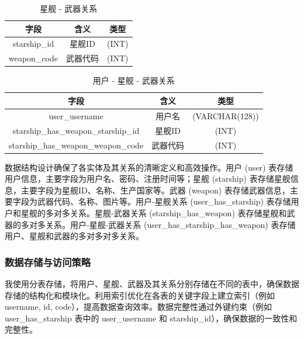 \documentclass{base}
\begin{document}
\begin{table}[H]
	\centering
	\caption{星舰 - 武器关系}
	\begin{tabular}{@{}ccc@{}}
		\toprule
		字段           & 含义   & 类型    \\ \midrule
		starship\_id & 星舰ID & (INT) \\
		weapon\_code & 武器代码 & (INT) \\ \bottomrule
	\end{tabular}
\end{table}

\begin{table}[H]
		\centering
	\caption{用户 - 星舰 - 武器关系}
	\begin{tabular}{@{}ccc@{}}
		\toprule
		字段                                                      & 含义                       & 类型                        \\ \midrule
		user\_username                                          & 用户名                      & (VARCHAR(128))            \\
		starship\_has\_weapon\_starship\_id                     & 星舰ID                     & (INT)                     \\
		starship\_has\_weapon\_weapon\_code & 武器代码 & (INT) \\ \bottomrule
	\end{tabular}
\end{table}

数据结构设计确保了各实体及其关系的清晰定义和高效操作。用户 (user) 表存储用户信息，主要字段为用户名、密码、注册时间等；星舰 (starship) 表存储星舰信息，主要字段为星舰ID、名称、生产国家等。武器 (weapon) 表存储武器信息，主要字段为武器代码、名称、图片等。用户-星舰关系 (user\_has\_starship) 表存储用户和星舰的多对多关系。星舰-武器关系 (starship\_has\_weapon) 表存储星舰和武器的多对多关系。用户-星舰-武器关系 (user\_has\_starship\_has\_weapon) 表存储用户、星舰和武器的多对多对多关系。

\subsubsection{数据存储与访问策略}

我使用分表存储，将用户、星舰、武器及其关系分别存储在不同的表中，确保数据存储的结构化和模块化。利用索引优化在各表的关键字段上建立索引（例如 username, id, code），提高数据查询效率。数据完整性通过外键约束（例如 user\_has\_starship 表中的 user\_username 和 starship\_id），确保数据的一致性和完整性。
\end{document}
